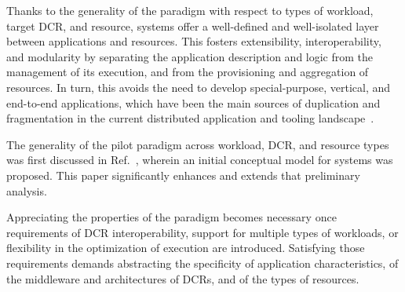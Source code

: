 \documentclass{sig-alternate}
\begin{document}




Thanks to the generality of the \pilot paradigm with respect to types of
workload, target DCR, and resource, \pilot systems offer a well-defined and
well-isolated layer between applications and resources. This fosters
extensibility, interoperability, and modularity by separating the application
description and logic from the management of its execution, and from the
provisioning and aggregation of resources. In turn, this avoids the need to
develop special-purpose, vertical, and end-to-end applications, which have been
the main sources of duplication and fragmentation in the current distributed
application and tooling landscape~\cite{dpa_surveypaper,dpagrid2009}.



The generality of the pilot paradigm across workload, DCR, and resource types
was first discussed in Ref.~\cite{luckow2012}, wherein an initial conceptual
model for \pilot systems was proposed. This paper significantly enhances and
extends that preliminary analysis.

Appreciating the properties of the \pilot paradigm becomes necessary once
requirements of DCR interoperability, support for multiple types of workloads,
or flexibility in the optimization of execution are introduced. Satisfying those
requirements demands abstracting the specificity of application characteristics,
of the middleware and architectures of DCRs, and of the types of resources.
\end{document}
